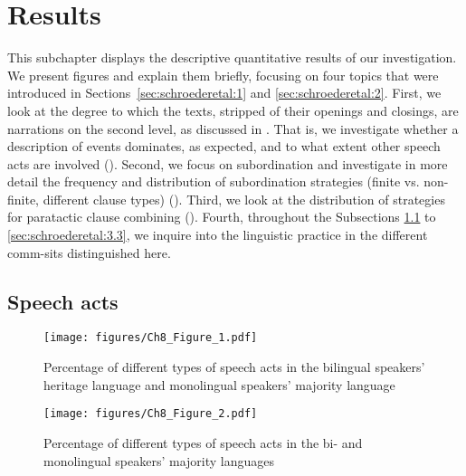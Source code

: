 \documentclass[output=paper,colorlinks,citecolor=brown]{langscibook}
\begin{document}
\section{Results} \label{sec:schroederetal:3}
This subchapter displays the descriptive quantitative results of our investigation. We present figures and explain them briefly, focusing on four topics that were introduced in Sections~\ref{sec:schroederetal:1} and \ref{sec:schroederetal:2}. First, we look at the degree to which the texts, stripped of their openings and closings, are narrations on the second level, as discussed in . That is, we investigate whether a description of events dominates, as expected, and to what extent other speech acts are involved (). Second, we focus on subordination and investigate in more detail the frequency and distribution of subordination strategies (finite vs. non-finite, different clause types) (). Third, we look at the distribution of strategies for paratactic clause combining (). Fourth, throughout the Subsections \ref{sec:schroederetal:3.1} to \ref{sec:schroederetal:3.3}, we inquire into the linguistic practice in the different comm-sits distinguished here.

\subsection{Speech acts} \label{sec:schroederetal:3.1}

\begin{figure}
    \centering
    \texttt{[image: figures/Ch8\_Figure\_1.pdf]}
    \caption{Percentage of different types of speech acts in the bilingual speakers’ heritage language and monolingual speakers’ majority language}
    \label{fig:schroederetal:1}
\end{figure}

\begin{figure}
    \centering
    \texttt{[image: figures/Ch8\_Figure\_2.pdf]}
    \caption{Percentage of different types of speech acts in the bi- and monolingual speakers’ majority languages}
    \label{fig:schroederetal:2}
\end{figure}
\end{document}
